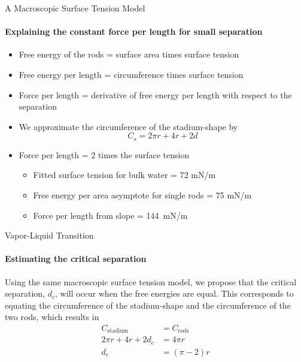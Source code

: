 \documentclass{beamer}
\begin{document}
\begin{frame}[fragile]{A Macroscopic Surface Tension Model}
\framesubtitle{Explaining the constant force per length for small separation}
\begin{itemize}
 \item <1-> Free energy of the rods = surface area times surface tension
 \item <2-> Free energy per length = circumference times surface tension
 \item <3-> Force per length = derivative of free energy per length with respect to the separation 
 \item <4-> We approximate the circumference of the stadium-shape by
  \begin{equation}
  C_{s} = 2\pi r +4r+2d
  \end{equation}
 \item <5-> Force per length = 2 times the surface tension
 \begin{itemize}
  \item <6-> Fitted surface tension for bulk water = 72 mN/m
  \item <6-> Free energy per area asymptote for single rods = 75 mN/m
  \item <6-> Force per length from slope = 144~mN/m
 \end{itemize}
\end{itemize}
\end{frame}

\begin{frame}[fragile]{Vapor-Liquid Transition}
\framesubtitle{Estimating the critical separation} 
Using the same macroscopic surface tension model, we propose that 
the critical separation, $d_c$, will occur when the free energies are equal. This 
corresponds to equating the circumference of the stadium-shape and the circumference of the two rods, which results in
\pause
\begin{align}
C_\text{stadium} &= C_\text{rods} \\
2\pi r +4r+2d_c &= 4\pi r \\
d_c &= (\pi-2)r
\end{align}
\end{frame}
\end{document}
